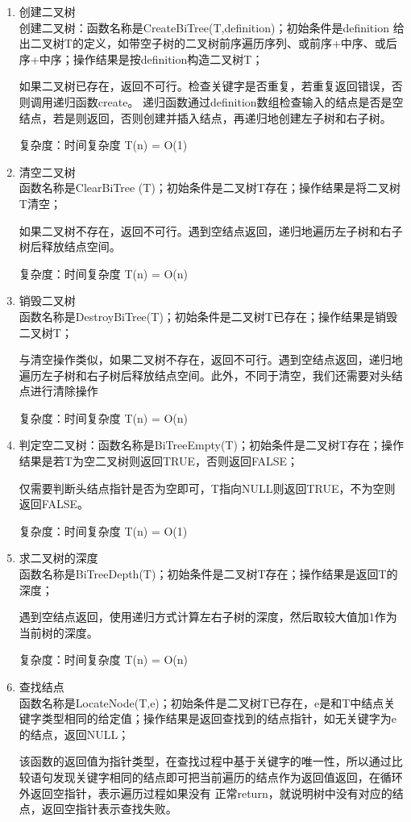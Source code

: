 \documentclass[supercite]{Experimental_Report}
\theoremstyle{definition}
\begin{document}
\begin{enumerate}
	\item 创建二叉树\\
	创建二叉树：函数名称是CreateBiTree(T,definition)；初始条件是definition 给出二叉树T的定义，如带空子树的二叉树前序遍历序列、或前序+中序、或后序+中序；操作结果是按definition构造二叉树T；
	
	如果二叉树已存在，返回不可行。检查关键字是否重复，若重复返回错误，否则调用递归函数create。
	递归函数通过definition数组检查输入的结点是否是空结点，若是则返回，否则创建并插入结点，再递归地创建左子树和右子树。
	
	复杂度：时间复杂度 T(n) = O(1)
	\item 清空二叉树\\
	函数名称是ClearBiTree (T)；初始条件是二叉树T存在；操作结果是将二叉树T清空；
	
	如果二叉树不存在，返回不可行。遇到空结点返回，递归地遍历左子树和右子树后释放结点空间。
	
	复杂度：时间复杂度 T(n) = O(n)
	\item 销毁二叉树\\
	函数名称是DestroyBiTree(T)；初始条件是二叉树T已存在；操作结果是销毁二叉树T；
	
	与清空操作类似，如果二叉树不存在，返回不可行。遇到空结点返回，递归地遍历左子树和右子树后释放结点空间。此外，不同于清空，我们还需要对头结点进行清除操作
	
	复杂度：时间复杂度 T(n) = O(n)
	\item 判定空二叉树：函数名称是BiTreeEmpty(T)；初始条件是二叉树T存在；操作结果是若T为空二叉树则返回TRUE，否则返回FALSE；
	
	仅需要判断头结点指针是否为空即可，T指向NULL则返回TRUE，不为空则返回FALSE。
	
	复杂度：时间复杂度 T(n) = O(1)
	\item 求二叉树的深度\\
	函数名称是BiTreeDepth(T)；初始条件是二叉树T存在；操作结果是返回T的深度；
	
	遇到空结点返回，使用递归方式计算左右子树的深度，然后取较大值加1作为当前树的深度。
	
	复杂度：时间复杂度 T(n) = O(n)
	\item 查找结点\\
	函数名称是LocateNode(T,e)；初始条件是二叉树T已存在，e是和T中结点关键字类型相同的给定值；操作结果是返回查找到的结点指针，如无关键字为e的结点，返回NULL；
	
	该函数的返回值为指针类型，在查找过程中基于关键字的唯一性，所以通过比较语句发现关键字相同的结点即可把当前遍历的结点作为返回值返回，在循环外返回空指针，表示遍历过程如果没有
	正常return，就说明树中没有对应的结点，返回空指针表示查找失败。
	

\end{enumerate}
\end{document}
